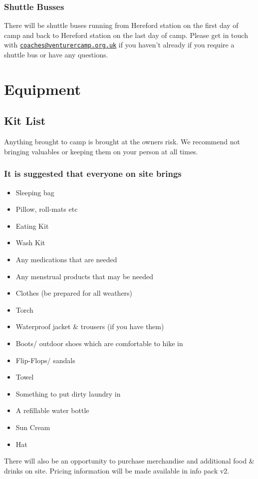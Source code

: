 \documentclass[a4paper, 11pt]{report}
\begin{document}
\subsection{Shuttle Busses}
There will be shuttle buses running from Hereford station on the first day of camp and back to Hereford station on the last day of camp. Please get in touch with \href{mailto:coaches@venturercamp.org.uk}{\texttt{coaches@venturercamp.org.uk}} if you haven't already if you require a shuttle bus or have any questions. 

\chapter{Equipment}
\section{Kit List}
Anything brought to camp is brought at the owners risk. We recommend not bringing valuables or keeping them on your person at all times.
\subsection{It is suggested that everyone on site brings}
\begin{itemize}
    \item Sleeping bag
    \item Pillow, roll-mats etc
    \item Eating Kit
    \item Wash Kit
    \item Any medications that are needed
    \item Any menstrual products that may be needed
    \item Clothes (be prepared for all weathers)
    \item Torch
    \item Waterproof jacket \& trousers (if you have them)
    \item Boots/ outdoor shoes which are comfortable to hike in
    \item Flip-Flops/ sandals
    \item Towel
    \item Something to put dirty laundry in
    \item A refillable water bottle
    \item Sun Cream
    \item Hat
\end{itemize}
There will also be an opportunity to purchase merchandise and additional food \& drinks on site. Pricing information will be made available in info pack v2.  
\end{document}
